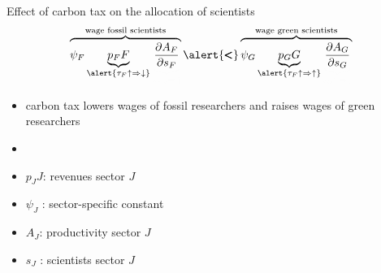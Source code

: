 \documentclass[11pt,aspectratio=169]{beamer}
\begin{document}
\addtocounter{framenumber}{-1}

\begin{frame}{Effect of carbon tax on the allocation of scientists}
	\vspace{0mm}
	\large
	\begin{align*}
		\color{black}
		\overbrace{{\psi_F} \underbrace{p_F{F}}_{{\alert{\tau_F\uparrow\Rightarrow\downarrow}}}\textcolor{black!1}{\underbrace{\textcolor{black}{\frac{\partial A_{F}}{\partial s_{F}}}}_{{{s_F\downarrow\Rightarrow\uparrow}}}}}^{\text{wage fossil scientists}}\alert{\pmb{<}}\overbrace{{\psi_G} \underbrace{p_G{G}}_{{\alert{\tau_F\uparrow\Rightarrow\uparrow}}}\textcolor{black!1}{\underbrace{\textcolor{black}{\frac{\partial A_{G}}{\partial s_{G}}}}_{	{{s_G\uparrow\Rightarrow\downarrow}}}}}^{\text{wage green scientists}}
	\end{align*}
	\normalsize
	\begin{itemize}
		\item carbon tax lowers wages of fossil researchers and raises wages of green researchers
		\vspace{2mm}
		\item[] \  %
	\end{itemize}
	\small
	\vspace{4mm}
	\hspace{-2mm}
	\begin{minipage}[t!]{0.4\textwidth}
		\vspace{0mm}
		\begin{itemize}
			\item[] $p_JJ$: revenues sector $J$
			\vspace{-2mm}
			\item[] $\psi_J$ : sector-specific constant
		\end{itemize}
	\end{minipage}
	\vspace{-5mm}
	\begin{minipage}[t!]{0.5\textwidth}
		\vspace{0mm}
		\begin{itemize}	
			\item[] $A_J$: productivity sector $J$
			\vspace{-2mm}			
			\item[] $s_J$ : scientists sector $J$
		\end{itemize}
	\end{minipage}
\end{frame}
\end{document}
